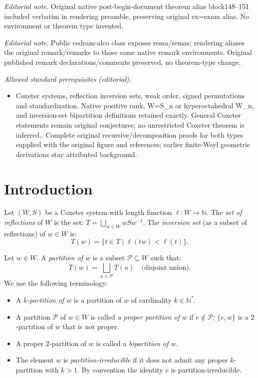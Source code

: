 \documentclass[Unicode]{cedram-alco}
\theoremstyle{definition}
\begin{document}
\noindent\textit{Editorial note.} Original native post-begin-document theorem alias block148--151 included verbatim in rendering preamble, preserving original ex=exam alias. No environment or theorem type invented.\par\medskip
\noindent\textit{Editorial note.} Public cedram-alco class exposes rema/remas; rendering aliases the original remark/remarks to those same native remark environments. Original published remark declarations/comments preserved, no theorem-type change.\par\medskip
\noindent\textit{Allowed standard prerequisites (editorial).}\begin{itemize}
\item Coxeter systems, reflection inversion sets, weak order, signed permutations and standardization. Native positive rank, W=S\_n or hyperoctahedral W\_n, and inversion-set bipartition definitions retained exactly. General Coxeter statements remain original conjectures; no unrestricted Coxeter theorem is inferred.. Complete original recursive/decomposition proofs for both types supplied with the original figure and references; earlier finite-Weyl geometric derivations stay attributed background.
\end{itemize}\medskip
\section{Introduction}   Let $(W,S)$ be a Coxeter system with length function $\ell:W\to \mathbb N$. The {\em set of reflections} of $W$ is the set:
$
T=\bigcup_{w\in W}wSw^{-1}.
$
 The {\em inversion set} (as a subset of reflections) of $w\in W$ is:
 $$
 T(w) = \{t \in T\mid \ell(tw)<\ell(t)\}.
 $$


\begin{defi}\label{def:1} Let $w\in W$. A {\em partition of $w$} is a subset $\mathcal P\subseteq W$ such that:
$$
T(w)=\bigsqcup_{u\in \mathcal P} T(u) \quad\textrm{(disjoint union)}.
$$
We use the following terminology:
\begin{itemize}
\item A {\em $k$-partition of $w$} is a partition of $w$ of cardinality $k\in\mathbb N^*$. 
\item A partition $\mathcal P$ of $w\in W$ is called {\em a proper partition of $w$} if $e\notin \mathcal P$; $\{e,w\}$ is a $2$-partition of $w$ that is not proper.
\item A proper $2$-partition of $w$ is called a {\em bipartition of $w$}. 
\item The element $w$ is {\em partition-irreducible} if it does not admit any proper $k$-partition with $k>1$. By convention the identity $e$ is partition-irreducible. 
\end{itemize}
\end{defi}
\end{document}
